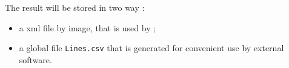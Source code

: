 The result will be stored in two way :

\begin{itemize}
    \item a xml file by image, that is used by \PPP ;
    \item a global file {\tt Lines.csv} that is generated for convenient use by external software.
\end{itemize}










